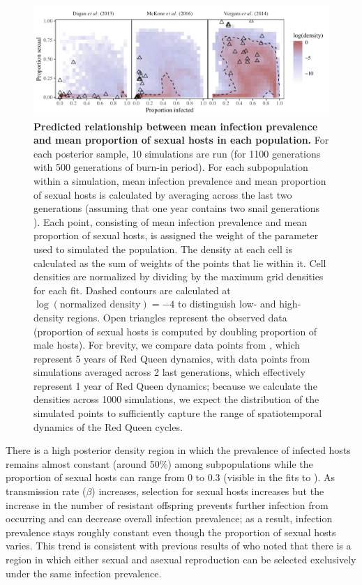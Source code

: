 \documentclass{article}\usepackage[]{graphicx}\usepackage[]{color}
\begin{document}
\begin{figure}[!ht]
\includegraphics[width=\textwidth]{../fig/simulated_data2.pdf}
\caption{{\bf Predicted relationship between mean infection prevalence and mean proportion of sexual hosts in each population.}
For each posterior sample, 10 simulations are run (for 1100 generations with 500 generations of burn-in period).
For each subpopulation within a simulation, mean infection prevalence and mean proportion of sexual hosts is calculated by averaging across the last two generations (assuming that one year contains two snail generations \citep{neiman2005variation}).
Each point, consisting of mean infection prevalence and mean proportion of sexual hosts, is assigned the weight of the parameter used to simulated the population.
The density at each cell is calculated as the sum of weights of the points that lie within it.
Cell densities are normalized by dividing by the maximum grid densities for each fit.
Dashed contours are calculated at $\log(\textrm{normalized density}) = -4$ to distinguish low- and high-density regions.
Open triangles represent the observed data (proportion of sexual hosts is computed by doubling proportion of male hosts).
For brevity, we compare data points from \cite{vergara2014infection}, which represent 5 years of Red Queen dynamics, with data points from simulations averaged across 2 last generations, which effectively represent 1 year of Red Queen dynamics;
because we calculate the densities across 1000 simulations, we expect the distribution of the simulated points to sufficiently capture the range of spatiotemporal dynamics of the Red Queen cycles.
}
\label{fig:ivs}
\end{figure}

There is a high posterior density region in which the prevalence of infected hosts remains almost constant (around 50\%) among subpopulations while the proportion of sexual hosts can range from 0 to 0.3 (visible in the fits to \cite{mckone2016fine}).
As transmission rate ($\beta$) increases, selection for sexual hosts increases but the increase in the number of resistant offspring prevents further infection from occurring and can decrease overall infection prevalence;
as a result, infection prevalence stays roughly constant even though the proportion of sexual hosts varies.
This trend is consistent with previous results of \cite{lively2001trematode} who noted that there is a region in which either sexual and asexual reproduction can be selected exclusively under the same infection prevalence.
\end{document}
